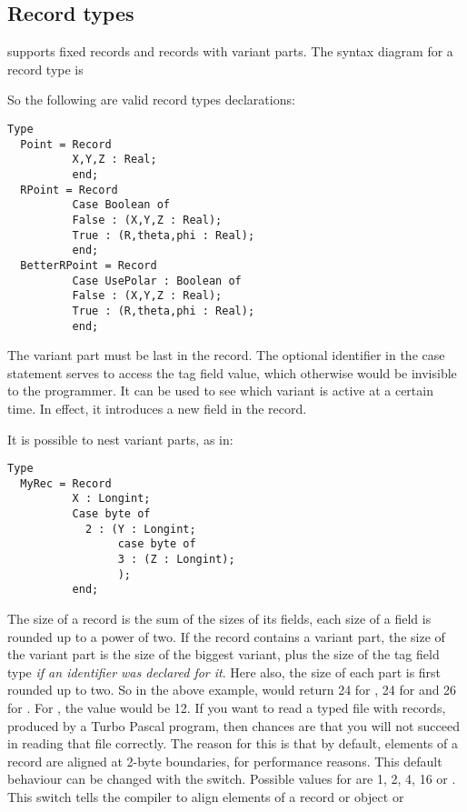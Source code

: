 \documentclass{report}
\begin{document}
\subsection{Record types}
\fpc supports fixed records and records with variant parts.
The syntax diagram for a record type is

So the following are valid record types declarations:
\begin{verbatim}
Type
  Point = Record
          X,Y,Z : Real;
          end;
  RPoint = Record
          Case Boolean of
          False : (X,Y,Z : Real);
          True : (R,theta,phi : Real);
          end;
  BetterRPoint = Record
          Case UsePolar : Boolean of
          False : (X,Y,Z : Real);
          True : (R,theta,phi : Real);
          end;
\end{verbatim}
The variant part must be last in the record. The optional identifier in the
case statement serves to access the tag field value, which otherwise would
be invisible to the programmer. It can be used to see which variant is
active at a certain time. In effect, it introduces a new field in the
record.
\begin{remark}
It is possible to nest variant parts, as in:
\begin{verbatim}
Type
  MyRec = Record
          X : Longint;
          Case byte of
            2 : (Y : Longint;
                 case byte of
                 3 : (Z : Longint);
                 );
          end;
\end{verbatim}
\end{remark}
The size of a record is the sum of the sizes of its fields, each size of a
field is rounded up to a power of two. If the record contains a variant part, the size
of the variant part is the size of the biggest variant, plus the size of the
tag field type {\em if an identifier was declared for it}. Here also, the size of
each part is first rounded up to two. So in the above example,
 would return 24 for , 24 for  and
26 for . For , the value would be 12.
If you want to read a typed file with records, produced by
a Turbo Pascal program, then chances are that you will not succeed in
reading that file correctly.
The reason for this is that by default, elements of a record are aligned at
2-byte boundaries, for performance reasons. This default behaviour can be
changed with the  switch. Possible values for
 are 1, 2, 4, 16 or .
This switch tells the compiler to align elements of a record or object or
\end{document}
